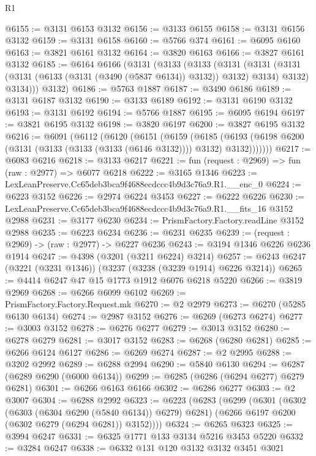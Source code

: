 \begin{lexlean}{R1}
\begin{coremodule}
@6155 := @3131 @6153 @3132
@6156 := @3133 @6155
@6158 := @3131 @6156 @3132
@6159 := @3131 @6158
@6160 := @5766 @374
@6161 := @6095 @6160
@6163 := @3821 @6161 @3132
@6164 := @3820 @6163
@6166 := @3827 @6161 @3132
@6185 := @6164
    @6166
    (@3131
      (@3133
        (@3133
          (@3131
            (@3131 (@3131 (@3131 (@6133 (@3131 (@3490 (@5837 @6134)) @3132)) @3132) @3134) @3132)
            @3134)))
      @3132)
@6186 := @5763 @1887
@6187 := @3490 @6186
@6189 := @3131 @6187 @3132
@6190 := @3133 @6189
@6192 := @3131 @6190 @3132
@6193 := @3131 @6192
@6194 := @5766 @1887
@6195 := @6095 @6194
@6197 := @3821 @6195 @3132
@6198 := @3820 @6197
@6200 := @3827 @6195 @3132
@6216 := @6091
    (@6112
      (@6120
        (@6151
          (@6159
            (@6185
              (@6193 (@6198 @6200 (@3131 (@3133 (@3133 (@3133 (@6146 @3132)))) @3132) @3132)))))))
@6217 := @6083 @6216
@6218 := @3133 @6217
@6221 := fun (request : @2969) => fun (raw : @2977) => @6077 @6218
@6222 := @3165 @1346
@6223 := LexLeanPreserve.Cc65deb3bca9f4688ecdccc4b9d3c76a9.R1.__enc_0
@6224 := @6223 @3152
@6226 := @2974 @6224 @3453
@6227 := @6222 @6226
@6230 := LexLeanPreserve.Cc65deb3bca9f4688ecdccc4b9d3c76a9.R1.__fits_16 @3152 @2988
@6231 := @3177 @6230
@6234 := PrismFactory.Factory.readLine @3152 @2988
@6235 := @6223 @6234
@6236 := @6231 @6235
@6239 := (request : @2969) -> (raw : @2977) -> @6227 @6236
@6243 := @3194 @1346 @6226 @6236 @1914
@6247 := @4398 (@3201 (@3211 @6224) @3214)
@6257 := @6243 @6247 (@3221 (@3231 @1346)) (@3237 (@3238 (@3239 @1914) @6226 @3214))
@6265 := @4414 @6247 @47 @15 @1773 @1912 @6076 @6218 @5220
@6266 := @3819 @2969
@6268 := @6266 @6099 @6102
@6269 := PrismFactory.Factory.Request.mk
@6270 := @2 @2979
@6273 := @6270 (@5285 @6130 @6134)
@6274 := @2987 @3152
@6276 := @6269 (@6273 @6274)
@6277 := @3003 @3152
@6278 := @6276 @6277
@6279 := @3013 @3152
@6280 := @6278 @6279
@6281 := @3017 @3152
@6283 := @6268 (@6280 @6281)
@6285 := @6266 @6124 @6127
@6286 := @6269 @6274
@6287 := @2 @2995
@6288 := @3202 @2992
@6289 := @6288 @2994
@6290 := @5840 @6130
@6294 := @6287 (@6289 @6290 (@6000 @6134))
@6299 := @6285 (@6286 (@6294 @6277) @6279 @6281)
@6301 := @6266 @6163 @6166
@6302 := @6286 @6277
@6303 := @2 @3007
@6304 := @6288 @2992
@6323 := @6223
    (@6283
      (@6299
        (@6301
          (@6302 (@6303 (@6304 @6290 (@5840 @6134)) @6279) @6281)
          (@6266 @6197 @6200 (@6302 @6279 (@6294 @6281)) @3152))))
@6324 := @6265 @6323
@6325 := @3994 @6247
@6331 := @6325 @1771 @133 @3134 @5216 @3453 @5220
@6332 := @3284 @6247
@6338 := @6332 @131 @120 @3132 @3132 @3451 @3021

\end{coremodule}
\end{lexlean}
